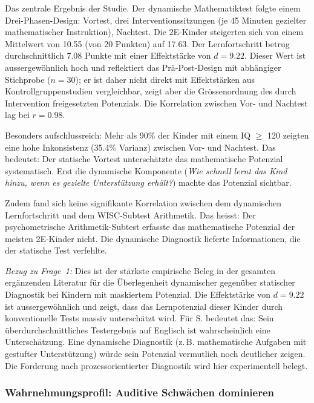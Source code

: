 \documentclass[ngerman, a4paper]{article}
\begin{document}
Das zentrale Ergebnis der Studie. Der dynamische Mathematiktest folgte
einem Drei-Phasen-Design: Vortest, drei Interventionssitzungen (je 45
Minuten gezielter mathematischer Instruktion), Nachtest. Die 2E-Kinder
steigerten sich von einem Mittelwert von 10.55 (von 20 Punkten) auf
17.63. Der Lernfortschritt betrug durchschnittlich 7.08 Punkte mit einer
Effektstärke von $d = 9.22$. Dieser Wert ist aussergewöhnlich hoch und
reflektiert das Prä-Post-Design mit abhängiger Stichprobe ($n = 30$); er
ist daher nicht direkt mit Effektstärken aus Kontrollgruppenstudien
vergleichbar, zeigt aber die Grössenordnung des durch Intervention
freigesetzten Potenzials. Die
Korrelation zwischen Vor- und Nachtest lag bei $r = 0.98$.

Besonders aufschlussreich: Mehr als 90\% der Kinder mit einem IQ $\geq$
120 zeigten eine hohe Inkonsistenz (35.4\% Varianz) zwischen Vor- und
Nachtest. Das bedeutet: Der statische Vortest unterschätzte das
mathematische Potenzial systematisch. Erst die dynamische Komponente
(\textit{Wie schnell lernt das Kind hinzu, wenn es gezielte Unterstützung
erhält?}) machte das Potenzial sichtbar.

Zudem fand sich keine signifikante Korrelation zwischen dem dynamischen
Lernfortschritt und dem WISC-Subtest Arithmetik. Das heisst: Der
psychometrische Arithmetik-Subtest erfasste das mathematische Potenzial
der meisten 2E-Kinder nicht. Die dynamische Diagnostik lieferte
Informationen, die der statische Test verfehlte.

\textit{Bezug zu Frage~1:} Dies ist der stärkste empirische Beleg in der
gesamten ergänzenden Literatur für die Überlegenheit dynamischer gegenüber
statischer Diagnostik bei Kindern mit maskiertem Potenzial. Die
Effektstärke von $d = 9.22$ ist aussergewöhnlich und zeigt, dass das
Lernpotenzial dieser Kinder durch konventionelle Tests massiv unterschätzt
wird. Für S. bedeutet das: Sein überdurchschnittliches Testergebnis auf
Englisch ist wahrscheinlich eine Unterschätzung. Eine dynamische
Diagnostik (z.\,B. mathematische Aufgaben mit gestufter Unterstützung)
würde sein Potenzial vermutlich noch deutlicher zeigen. Die Forderung nach
prozessorientierter Diagnostik
\parencite{lemas2023begriffsklaerung} wird hier
experimentell belegt.

\subsubsection*{Wahrnehmungsprofil: Auditive Schwächen dominieren}
\end{document}
